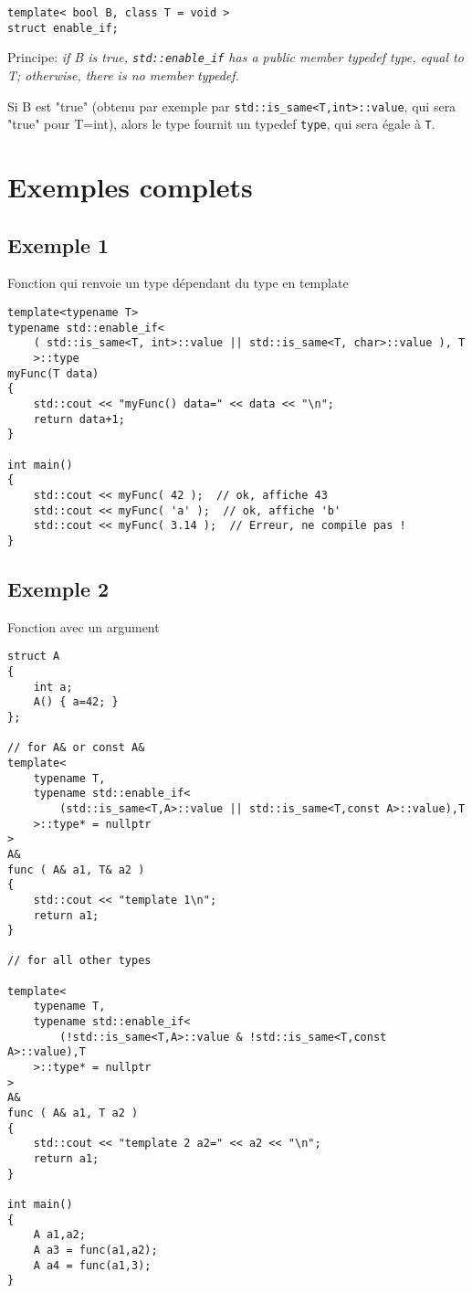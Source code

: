\documentclass[11pt,a4paper]{article}
\begin{document}
\begin{lstlisting}
template< bool B, class T = void >
struct enable_if;
\end{lstlisting}

Principe:
{\em if B is true, {\tt std::enable\_if} has a public member typedef type, equal to T; otherwise, there is no member typedef. }

Si B est "true" (obtenu par exemple par {\tt std::is\_same<T,int>::value}, qui sera "true" pour T=int), alors le type fournit un typedef {\tt type}, qui sera égale à {\tt T}.


\section{Exemples complets}


\subsection{Exemple 1}
Fonction qui renvoie un type dépendant du type en template

\begin{lstlisting}
template<typename T>
typename std::enable_if<
	( std::is_same<T, int>::value || std::is_same<T, char>::value ), T
	>::type
myFunc(T data)
{
	std::cout << "myFunc() data=" << data << "\n";
	return data+1;
}

int main()
{
    std::cout << myFunc( 42 );  // ok, affiche 43
    std::cout << myFunc( 'a' );  // ok, affiche 'b'
    std::cout << myFunc( 3.14 );  // Erreur, ne compile pas !      
}
\end{lstlisting}



\subsection{Exemple 2}
Fonction avec un argument

\begin{lstlisting}
struct A
{
    int a;
    A() { a=42; }
};

// for A& or const A&
template<
	typename T,
	typename std::enable_if<
		(std::is_same<T,A>::value || std::is_same<T,const A>::value),T
	>::type* = nullptr
> 
A&
func ( A& a1, T& a2 )
{
    std::cout << "template 1\n";
    return a1;
}

// for all other types

template<
	typename T,
	typename std::enable_if<
		(!std::is_same<T,A>::value & !std::is_same<T,const A>::value),T
	>::type* = nullptr
> 
A&
func ( A& a1, T a2 )
{
    std::cout << "template 2 a2=" << a2 << "\n";
    return a1;
}
 
int main()
{
    A a1,a2;
    A a3 = func(a1,a2);
    A a4 = func(a1,3);
}
\end{lstlisting}
\end{document}
